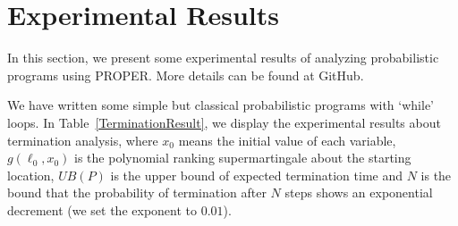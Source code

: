 \documentclass[sigconf,review, anonymous]{acmart}
\begin{document}
\section{Experimental Results}
In this section, we present some experimental results of analyzing probabilistic programs using PROPER. More details can be found at GitHub.


We have written some simple but classical probabilistic programs with `while' loops. In Table~\ref{TerminationResult}, we display the experimental results about termination analysis, where $x_0$ means the initial value of each variable, $g(\ell_0,x_0)$ is the polynomial ranking supermartingale about the starting location, $UB(P)$ is the upper bound of expected termination time and $N$ is the bound that the probability of termination after $N$ steps shows an exponential decrement (we set the exponent to  $0.01$).
\end{document}
